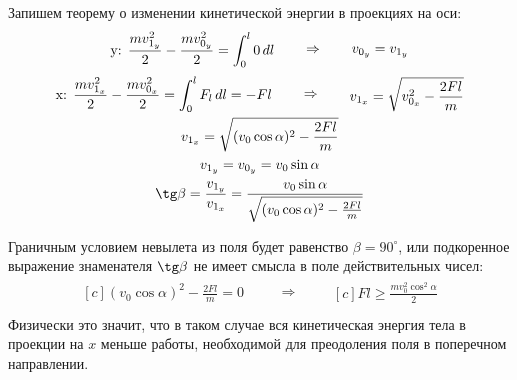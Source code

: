 \documentclass[a5paper,10pt]{article}\usepackage[usenames,dvipsnames]{color}\usepackage{cmap,graphicx,misccorr,indentfirst,makecell,multirow,ulem,geometry,amssymb,amsfonts,amsmath,amsthm,titlesec,float,fancyhdr,wrapfig,tikz}\usepackage[T2A]{fontenc}\usepackage[utf8x]{inputenc}\usepackage[english, russian]{babel}\usetikzlibrary{decorations.pathreplacing,decorations.pathmorphing,patterns,calc,scopes,arrows,through}\graphicspath{{img/}}\linespread{1.3}\frenchspacing\geometry{left=1cm, right=1cm, top=2cm, bottom=1cm, bindingoffset=0cm}\pagestyle{fancy}\fancyhead{}\fancyhead[R]{Сарафанов Ф.Г.}
\begin{document}
Запишем теорему о изменении кинетической энергии в проекциях на оси:
\begin{gather*}
    \xdef\mv{\frac{mv_{0_y}^2}{2}}\xdef\mvv{\frac{mv_{1_y}^2}{2}}\xdef\mgk{\frac{mg}{k}}%
    \begin{aligned}[c]
        \text{y: } \mvv-\mv=\int_0^l 0\,dl\\
    \end{aligned}
        \qquad\Rightarrow\qquad
    \begin{aligned}[c]
        v_{0_y}=v_{1_y}
    \end{aligned}
\end{gather*}
\begin{gather*}
    \xdef\mv{\frac{mv_{0_x}^2}{2}}\xdef\mvv{\frac{mv_{1_x}^2}{2}}\xdef\mgk{\frac{mg}{k}}%
    \begin{aligned}[c]
        \text{x: } \mvv-\mv=\int_0^l F_l\,dl=-Fl\\
    \end{aligned}
        \qquad\Rightarrow\qquad
    \begin{aligned}[c]
        v_{1_x}=\sqrt{v_{0_x}^2-\frac{2Fl}{m}}
    \end{aligned}\\
    v_{1_x}=\sqrt{(v_0\cos\alpha)^2-\frac{2Fl}{m}}\\
    v_{1_y}=v_{0_y}=v_0\sin\alpha\\
    \tg\beta=\frac{v_{1_y}}{v_{1_x}}=\frac{v_0\sin\alpha}{\sqrt{(v_0\cos\alpha)^2-\frac{2Fl}{m}}}
\end{gather*}

Граничным условием невылета из поля будет равенство $\beta=90^\circ$, или подкоренное выражение знаменателя $\tg\beta$ не имеет смысла в поле действительных чисел:
\begin{gather*}
    \begin{aligned}[c]
        (v_0\cos\alpha)^2-\frac{2Fl}{m}=0
    \end{aligned}
        \qquad\Rightarrow\qquad
    \begin{aligned}[c]
        Fl\geq\frac{mv_0^2\cos^2\alpha}{2}
    \end{aligned}\\
\end{gather*}
Физически это значит, что в таком случае вся кинетическая энергия тела в проекции на $x$ меньше работы, необходимой для преодоления поля в поперечном направлении.
\end{document}

